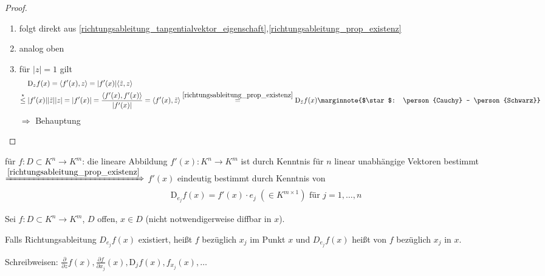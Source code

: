 \begin{proof}\hspace*{0pt}
	\begin{enumerate}[label={\arabic*)},topsep=\dimexpr -\baselineskip / 2 \relax]
		\item folgt direkt aus \eqref{richtungsableitung_tangentialvektor_eigenschaft},\eqref{richtungsableitung_prop_existenz}
		\item analog oben
		\item für $\vert z \vert = 1$ gilt
		\zeroAmsmathAlignVSpaces \begin{align*}
			&\mathrm{D}_z f(x) = \langle f'(x), z \rangle = \vert f'(x) \vert \langle \tilde{z},z\rangle \\
			\overset{\star}{\le}\; &\vert f'(x) \vert  \vert \tilde{z}\vert \vert z \vert = \vert f'(x)\vert = \frac{\langle f'(x), f'(x)\rangle}{\vert f'(x) \vert} = \langle f'(x), \tilde{z} \rangle \overset{\eqref{richtungsableitung_prop_existenz}}{=} \mathrm{D}_{\tilde{z}}f(x)\marginnote{$\star$: \person{Cauchy} - \person{Schwarz}}
		\end{align*}
		$\Rightarrow$ Behauptung
	\end{enumerate}
\end{proof}

\begin{boldenvironment}[Feststellung]
	für $f:D\subset K^n\to K^m$: die lineare Abbildung $f'(x):K^n\to K^m$ ist durch Kenntnis für $n$ linear unabhängige Vektoren bestimmt\\
	$\xRightarrow{\eqref{richtungsableitung_prop_existenz}}$ $f'(x)$ eindeutig bestimmt durch Kenntnis von \begin{align*}
		\mathrm{D}_{e_j} f(x) = f'(x) \cdot e_j \;(\in K^{m\times 1}) \text{ für } j = 1,\dotsc,n
	\end{align*}
\end{boldenvironment}

\begin{*definition}
	Sei $f:D\subset K^n\to K^m$, $D$ offen, $x\in D$ (nicht notwendigerweise \gls{diffbar} in $x$).
	
	Falls Richtungsableitung $D_{e_j} f(x)$ existiert, heißt $f$  bezüglich $x_j$ im Punkt $x$ und $D_{e_j} f(x)$ heißt  von $f$ bezüglich $x_j$ in $x$.
	
	Schreibweisen: $\frac{\partial }{\partial z}f(x), \frac{\partial f}{\partial x_j}(x), \mathrm{D}_j f(x), f_{x_j}(x), \dotsc$
\end{*definition}

